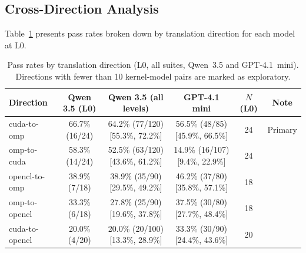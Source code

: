 \documentclass[conference]{IEEEtran}
\begin{document}
\subsection{Cross-Direction Analysis}
\label{sec:direction-analysis}

Table~\ref{tab:direction-rates} presents pass rates broken down by translation direction for each model at L0.

\begin{table}[t]
\centering
\caption{Pass rates by translation direction (L0, all suites, Qwen~3.5 and GPT-4.1~mini). Directions with fewer than 10 kernel-model pairs are marked as exploratory.}
\label{tab:direction-rates}
\small
\begin{tabular}{@{}lccccc@{}}
\toprule
Direction & Qwen 3.5 (L0) & Qwen 3.5 (all levels) & GPT-4.1 mini & $N$ (L0) & Note \\
\midrule
cuda-to-omp & 66.7\% (16/24) & 64.2\% (77/120) [55.3\%, 72.2\%] & 56.5\% (48/85) [45.9\%, 66.5\%] & 24 & Primary \\ %
omp-to-cuda & 58.3\% (14/24) & 52.5\% (63/120) [43.6\%, 61.2\%] & 14.9\% (16/107) [9.4\%, 22.9\%] & 24 & \\ %
opencl-to-omp & 38.9\% (7/18) & 38.9\% (35/90) [29.5\%, 49.2\%] & 46.2\% (37/80) [35.8\%, 57.1\%] & 18 & \\ %
omp-to-opencl & 33.3\% (6/18) & 27.8\% (25/90) [19.6\%, 37.8\%] & 37.5\% (30/80) [27.7\%, 48.4\%] & 18 & \\ %
cuda-to-opencl & 20.0\% (4/20) & 20.0\% (20/100) [13.3\%, 28.9\%] & 33.3\% (30/90) [24.4\%, 43.6\%] & 20 & \\ %

\end{tabular}
\end{table}
\end{document}
